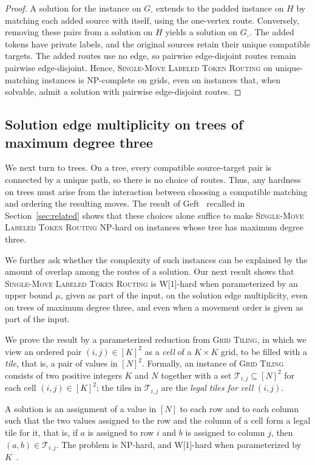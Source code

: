 \documentclass[a4paper,USenglish,thm-restate]{lipics-v2021}
\theoremstyle{problemstyle}
\begin{document}
\begin{proof}
A solution for the instance on $G_\square$ extends to the padded instance
on $H$ by matching each added source with itself, using the one-vertex
route. Conversely, removing these pairs from a solution on $H$ yields a
solution on $G_\square$. The added tokens have private labels, and the
original sources retain their unique compatible targets. The added routes
use no edge, so pairwise edge-disjoint routes remain pairwise edge-disjoint.
Hence, \textsc{Single-Move Labeled Token Routing} on unique-matching
instances is \textsf{NP}-complete on grids, even on instances that, when
solvable, admit a solution with pairwise edge-disjoint routes.
\end{proof}

\subsection{Solution edge multiplicity on trees of maximum degree three}
\label{sec:tree-hardness}
We next turn to trees. On a tree, every compatible source-target pair is
connected by a unique path, so there is no choice of routes. Thus, any
hardness on trees must arise from the interaction between choosing a
compatible matching and ordering the resulting moves. The result of
Geft~\cite{Geft2026Trees} recalled in Section~\ref{sec:related} shows that
these choices alone suffice to make \textsc{Single-Move Labeled Token
Routing} \textsf{NP}-hard on instances whose tree has maximum degree three.

We further ask whether the complexity of such instances can be explained by
the amount of overlap among the routes of a solution. Our next result shows
that \textsc{Single-Move Labeled Token Routing}
is \textsf{W}[1]-hard when parameterized by an upper bound $\mu$, given as
part of the input, on the solution edge multiplicity, even
on trees of maximum degree three, and even when a movement order is given as
part of the input.

We prove the result by a parameterized reduction from \textsc{Grid Tiling}, in which we view an ordered pair $(i,j)\in[K]^2$ as a \emph{cell} of a $K\times K$ grid, to be filled with a \emph{tile}, that is, a pair of values in $[N]^2$. Formally, an instance of \textsc{Grid Tiling} consists of two positive integers $K$ and $N$ together with a set $\mathcal{T}_{i,j}\subseteq[N]^2$ for each cell $(i,j)\in[K]^2$; the tiles in $\mathcal{T}_{i,j}$ are the \emph{legal tiles for cell} $(i,j)$.

A solution is an assignment of a value in $[N]$ to each row and to each column such that the two values assigned to the row and the column of a cell form a legal tile for it, that is, if $a$ is assigned to row $i$ and $b$ is assigned to column $j$, then $(a,b)\in\mathcal{T}_{i,j}$. The problem is \textsf{NP}-hard, and \textsf{W}[1]-hard when parameterized by $K$~\cite{Marx2007GT,cygan2015parameterized}.
\end{document}
